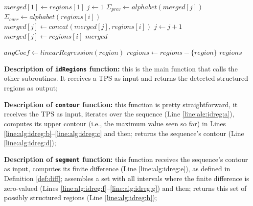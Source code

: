 \begin{small}
\begin{algorithm}
\begin{algorithmic}[1]

 
\State $merged[1] \leftarrow regions[1]$
\State $j \leftarrow 1$ 
\label{line:alg:idreg:i}
\State $\Sigma_{prev} \leftarrow alphabet(merged[j])$ \label{line:alg:idreg:j}
\State $\Sigma_{curr} \leftarrow alphabet(regions[i])$
\State $merged[j] \leftarrow concat(merged[j], regions[i])$
\Else 
\State $j \leftarrow j + 1$ 
\State $merged[j] \leftarrow regions[i]$ 
\EndIf \label{line:alg:idreg:k}
\EndFor
\State 
\Return $merged$ \label{line:alg:idreg:l}
\EndFunction


 
\label{line:alg:idreg:m}
\State $angCoef \leftarrow linearRegression(region)$\label{line:alg:idreg:n}
\label{line:alg:idreg:o}
\State $regions \leftarrow regions - \{region\}$\label{line:alg:idreg:p}
\EndIf
\EndFor
\State \Return $regions$\label{line:alg:idreg:q}
\EndFunction

\end{algorithmic}
\end{algorithm}
\end{small}

\textbf{Description of \texttt{idRegions} function:} this is the main function
that calls the other subroutines. It receives a TPS as input and returns the
detected structured regions as output;

\textbf{Description of \texttt{contour} function:} this function is
pretty straightforward, it receives the TPS as input, iterates over the sequence (Line
\ref{line:alg:idreg:a}), computes its upper contour (i.e., the maximum value
seen so far) in Lines \ref{line:alg:idreg:b}--\ref{line:alg:idreg:c} and then;
returns the sequence's contour (Line \ref{line:alg:idreg:d});

\textbf{Description of \texttt{segment} function:} this function receives the
sequence's contour as input, computes its finite difference (Line
\ref{line:alg:idreg:e}), as defined in Definition \ref{def:diff};
assembles a set with all intervals where the finite difference is zero-valued
(Lines \ref{line:alg:idreg:f}--\ref{line:alg:idreg:g}) and then; returns this
set of possibly structured regions (Line \ref{line:alg:idreg:h});

